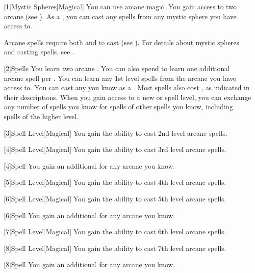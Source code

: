         [1]{Mystic Spheres}[Magical]
        You can use arcane magic.
        You gain access to two arcane  (see ).
        As a , you can cast any  spells from any mystic sphere you have access to.

        Arcane spells require both  and  to cast (see ).
        For details about mystic spheres and casting spells, see .

        [2]{Spells} You learn two arcane .
        You can also spend  to learn one additional arcane spell per .
        You can learn any 1st level spells from the arcane  you have access to.
        You can cast any  you know as a .
        Most spells also cost , as indicated in their descriptions.
        When you gain access to a new  or spell level, you can exchange any number of spells you know for spells of other spells you know, including spells of the higher level.

        [3]{Spell Level}[Magical] You gain the ability to cast 2nd level arcane spells.

        [4]{Spell Level}[Magical] You gain the ability to cast 3rd level arcane spells.

        [4]{Spell} You gain an additional  for any arcane  you know.

        [5]{Spell Level}[Magical] You gain the ability to cast 4th level arcane spells.

        [6]{Spell Level}[Magical] You gain the ability to cast 5th level arcane spells.

        [6]{Spell} You gain an additional  for any arcane  you know.

        [7]{Spell Level}[Magical] You gain the ability to cast 6th level arcane spells.

        [8]{Spell Level}[Magical] You gain the ability to cast 7th level arcane spells.

        [8]{Spell} You gain an additional  for any arcane  you know.

